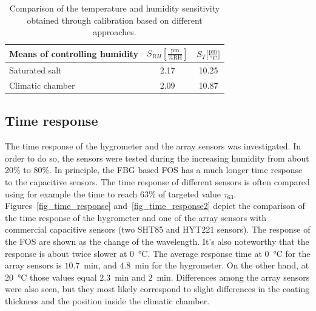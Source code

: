 \begin{table}[!h]
\centering
\caption{Comparison of the temperature and humidity sensitivity obtained through calibration based on different approaches.}
\label{tab:fos}
\begin{tabular}{lcc}
Means of controlling humidity & $S_{RH} \mathrm{[\frac{pm}{\%RH}]}$ & $S_{T}\mathrm{[\frac{pm}{\SI{}{\celsius}}}]$  \\ \hline
Saturated salt                & 2.17     & 10.25   \\
Climatic chamber              & 2.09     & 10.87  
\end{tabular}%
\end{table}


\subsection{Time response}
The time response of the hygrometer and the array sensors was investigated. In order to do so, the sensors were tested during the increasing humidity from about 20\% to 80\%. In principle, the \gls{FBG} based \gls{FOS} has a much longer time response to the capacitive sensors. The time response of different sensors is often compared using for example the time to reach 63\% of targeted value $\tau_{63}$. Figures~\ref{fig_time_response} and~\ref{fig_time_response2} depict the comparison of the time response of the hygrometer and one of the array sensors with commercial capacitive sensors (two SHT85 and HYT221 sensors). The response of the \gls{FOS} are shown as the change of the wavelength. It's also noteworthy that the response is about twice slower at \SI{0}{\celsius}. The average response time at \SI{0}{\celsius} for the array sensors is $10.7$~min, and $4.8$~min for the hygrometer. On the other hand, at \SI{20}{\celsius} those values equal $2.3$~min and $2$~min. Differences among the array sensors were also seen, but they most likely correspond to slight differences in the coating thickness and the position inside the climatic chamber. 

